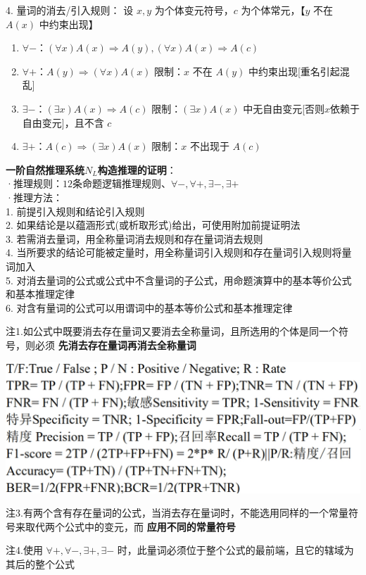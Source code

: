 4. 量词的消去/引入规则：
设 $x, y$ 为个体变元符号，$c$ 为个体常元，【$y$ 不在 $A(x)$ 中约束出现】
\begin{enumerate}
	\item \textbf{$\forall -$}：$(\forall x) A(x) \Rightarrow A(y), (\forall x) A(x) \Rightarrow A(c)$
	\item \textbf{$\forall +$}：$A(y) \Rightarrow (\forall x) A(x)$ 限制：$x$ 不在 $A(y)$ 中约束出现[重名引起混乱]
	\item \textbf{$\exists -$}：$(\exists x) A(x) \Rightarrow A(c)$ 限制：$(\exists x) A(x)$ 中无自由变元[否则$x$依赖于自由变元]，且不含 $c$
	\item \textbf{$\exists +$}：$A(c) \Rightarrow (\exists x) A(x)$ 限制：$x$ 不出现于 $A(c)$
\end{enumerate}

\textbf{一阶自然推理系统$N_L$构造推理的证明}：\\
\fontsize{5.9pt}{6pt}
·推理规则：$12$条命题逻辑推理规则、$\forall -, \forall +, \exists -, \exists +$\\
\fontsize{6pt}{7pt}
·推理方法：\\
1. 前提引入规则和结论引入规则\\
2. 如果结论是以蕴涵形式(或析取形式)给出，可使用附加前提证明法\\
3. 若需消去量词，用全称量词消去规则和存在量词消去规则\\
4. 当所要求的结论可能被定量时，用全称量词引入规则和存在量词引入规则将量词加入\\
5. 对消去量词的公式或公式中不含量词的子公式，用命题演算中的基本等价公式和基本推理定律\\
6. 对含有量词的公式可以用谓词中的基本等价公式和基本推理定律

注1.如公式中既要消去存在量词又要消去全称量词，且所选用的个体是同一个符号，则必须 \textbf{先消去存在量词再消去全称量词}

\begin{figurehere}
	\centering
	\includegraphics[width=0.7\linewidth]{image02}
	\label{fig:image02}
\end{figurehere}

注3.有两个含有存在量词的公式，当消去存在量词时，不能选用同样的一个常量符号来取代两个公式中的变元，而 \textbf{应用不同的常量符号}

注4.使用 $\forall +, \forall -, \exists +, \exists -$ 时，此量词必须位于整个公式的最前端，且它的辖域为其后的整个公式

